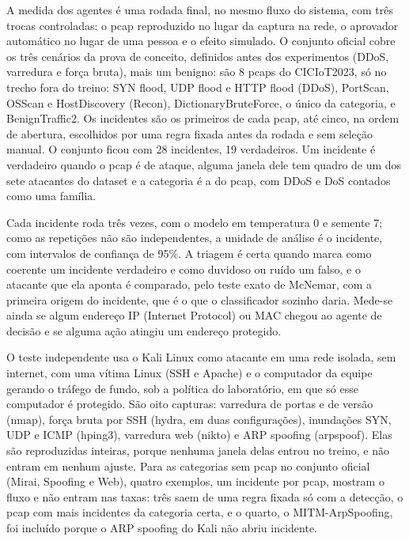 A medida dos agentes é uma rodada final, no mesmo fluxo do sistema, com três trocas controladas: o pcap reproduzido no lugar da captura na rede, o aprovador automático no lugar de uma pessoa e o efeito simulado. O conjunto oficial cobre os três cenários da prova de conceito, definidos antes dos experimentos (DDoS, varredura e força bruta), mais um benigno: são 8 pcaps do CICIoT2023, só no trecho fora do treino: SYN flood, UDP flood e HTTP flood (DDoS), PortScan, OSScan e HostDiscovery (Recon), DictionaryBruteForce, o único da categoria, e BenignTraffic2. Os incidentes são os primeiros de cada pcap, até cinco, na ordem de abertura, escolhidos por uma regra fixada antes da rodada e sem seleção manual. O conjunto ficou com 28 incidentes, 19 verdadeiros. Um incidente é verdadeiro quando o pcap é de ataque, alguma janela dele tem quadro de um dos sete atacantes do dataset e a categoria é a do pcap, com DDoS e DoS contados como uma família.

Cada incidente roda três vezes, com o modelo em temperatura 0 e semente 7; como as repetições não são independentes, a unidade de análise é o incidente, com intervalos de confiança de 95\%. A triagem é certa quando marca como coerente um incidente verdadeiro e como duvidoso ou ruído um falso, e o atacante que ela aponta é comparado, pelo teste exato de McNemar, com a primeira origem do incidente, que é o que o classificador sozinho daria. Mede-se ainda se algum endereço IP (Internet Protocol) ou MAC chegou ao agente de decisão e se alguma ação atingiu um endereço protegido.

O teste independente usa o Kali Linux como atacante em uma rede isolada, sem internet, com uma vítima Linux (SSH e Apache) e o computador da equipe gerando o tráfego de fundo, sob a política do laboratório, em que só esse computador é protegido. São oito capturas: varredura de portas e de versão (nmap), força bruta por SSH (hydra, em duas configurações), inundações SYN, UDP e ICMP (hping3), varredura web (nikto) e ARP spoofing (arpspoof). Elas são reproduzidas inteiras, porque nenhuma janela delas entrou no treino, e não entram em nenhum ajuste. Para as categorias sem pcap no conjunto oficial (Mirai, Spoofing e Web), quatro exemplos, um incidente por pcap, mostram o fluxo e não entram nas taxas: três saem de uma regra fixada só com a detecção, o pcap com mais incidentes da categoria certa, e o quarto, o MITM-ArpSpoofing, foi incluído porque o ARP spoofing do Kali não abriu incidente.
